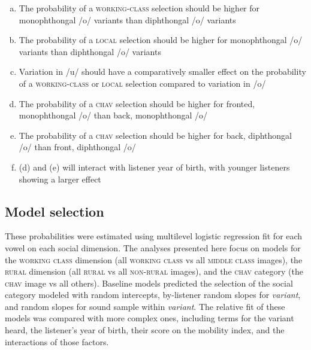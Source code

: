 \documentclass[PWPL]{article}
\begin{document}
\begin{enumerate}[(a)]
\item{The probability of a \textsc{working-class} selection should be higher for monophthongal /o/ variants than diphthongal /o/ variants}
\item{The probability of a \textsc{local} selection should be higher for monophthongal /o/ variants than diphthongal /o/ variants}
\item{Variation in /u/ should have a comparatively smaller effect on the probability of a \textsc{working-class} or \textsc{local} selection compared to variation in /o/}
\item{The probability of a \textsc{chav} selection should be higher for fronted, monophthongal /o/ than back, monophthongal /o/}
\item{The probability of a \textsc{chav} selection should be higher for back, diphthongal /o/ than front, diphthongal /o/}
\item{(d) and (e) will interact with listener year of birth, with younger listeners showing a larger effect}
\end{enumerate}

\subsection{Model selection}

These probabilities were estimated using multilevel logistic regression fit for each vowel on each social dimension. The analyses presented here focus on models for the \textsc{working class} dimension (all \textsc{working class} vs all \textsc{middle class} images), the \textsc{rural} dimension (all \textsc{rural} vs all \textsc{non-rural} images), and the \textsc{chav} category (the \textsc{chav} image vs all others).  Baseline models predicted the selection of the social category modeled with random intercepts, by-listener random slopes for \textit{variant}, and random slopes for sound sample within \textit{variant}.
The relative fit of these models was compared with more complex ones, including terms for the variant heard, the listener's year of birth, their score on the mobility index, and the interactions of those factors.
\end{document}
